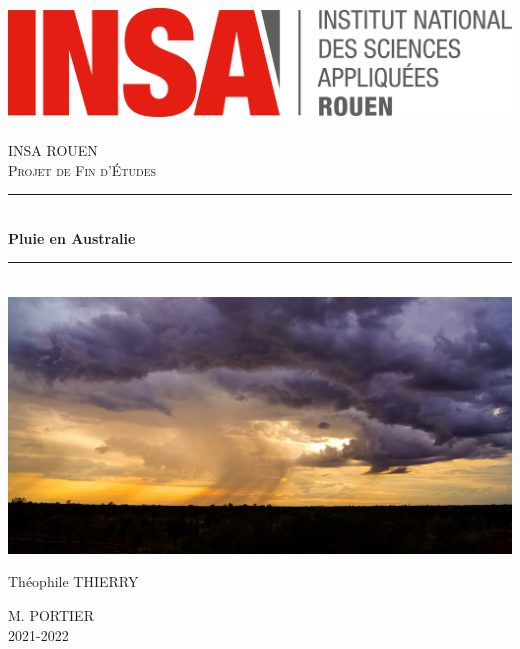 \documentclass{article}
\begin{document}
\newcommand{\HRule}{\rule{\linewidth}{0.5mm}}

\begin{titlepage}
  \begin{sffamily}
  \begin{center}
    \hfill
    \includegraphics[scale=0.06]{./Images/logoINSARouen.png}~\\[1.5cm]

    \textsc{\LARGE INSA ROUEN}\\[1cm]

    \textsc{\Large Projet de Fin d'Études}\\[1cm]

    \HRule \\[0.4cm]
    { \huge \bfseries Pluie en Australie\\[0.4cm] }

    \HRule \\[2cm]
    \includegraphics[width=\textwidth]{Images/accueil.jpg}
    \\[1cm]

    \begin{minipage}{0.4\textwidth}
      \begin{flushleft} \large
        Théophile THIERRY\\
      \end{flushleft}
    \end{minipage}
    \begin{minipage}{0.4\textwidth}
      \begin{flushright} \large
        \textsc{M. PORTIER}\\
         2021-2022\\
      \end{flushright}
    \end{minipage}

    \vfill

  \end{center}
  \end{sffamily}
\end{titlepage}
\end{document}
